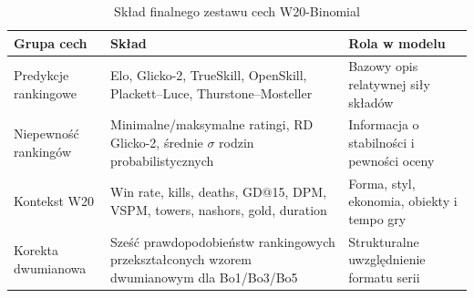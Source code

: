 \begin{table}[H]
    \centering
    \small
    \caption{Skład finalnego zestawu cech W20-Binomial}
    \label{tab:metamodel_feature_sets}
    \begin{tabular}{p{3.4cm}p{7.3cm}p{3.3cm}}
        \toprule
        Grupa cech & Skład & Rola w modelu \\
        \midrule
        Predykcje rankingowe
            & Elo, Glicko-2, TrueSkill, OpenSkill, Plackett--Luce, Thurstone--Mosteller
            & Bazowy opis relatywnej siły składów \\
        Niepewność rankingów
            & Minimalne/maksymalne ratingi, RD Glicko-2, średnie $\sigma$ rodzin probabilistycznych
            & Informacja o stabilności i pewności oceny \\
        Kontekst W20
            & Win rate, kills, deaths, GD@15, DPM, VSPM, towers, nashors, gold, duration
            & Forma, styl, ekonomia, obiekty i tempo gry \\
        Korekta dwumianowa
            & Sześć prawdopodobieństw rankingowych przekształconych wzorem dwumianowym dla Bo1/Bo3/Bo5
            & Strukturalne uwzględnienie formatu serii \\
        \bottomrule
    \end{tabular}
\end{table}

